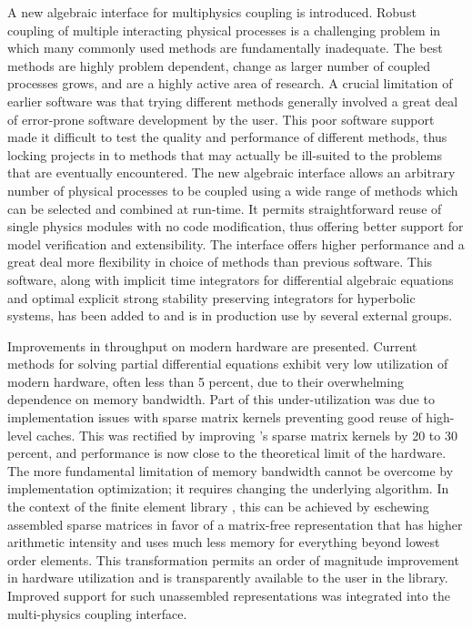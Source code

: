 A new algebraic interface for multiphysics coupling is introduced.
Robust coupling of multiple interacting physical processes is a challenging problem in which many commonly used methods are fundamentally inadequate.
The best methods are highly problem dependent, change as larger number of coupled processes grows, and are a highly active area of research.
A crucial limitation of earlier software was that trying different methods generally involved a great deal of error-prone software development by the user.
This poor software support made it difficult to test the quality and performance of different methods, thus locking projects in to methods that may actually be ill-suited to the problems that are eventually encountered.
The new algebraic interface allows an arbitrary number of physical processes to be coupled using a wide range of methods which can be selected and combined at run-time.
It permits straightforward reuse of single physics modules with no code modification, thus offering better support for model verification and extensibility.
The interface offers higher performance and a great deal more flexibility in choice of methods than previous software.
This software, along with implicit time integrators for differential algebraic equations and optimal explicit strong stability preserving integrators for hyperbolic systems, has been added to {\PETSc} and is in production use by several external groups.

Improvements in throughput on modern hardware are presented.
Current methods for solving partial differential equations exhibit very low utilization of modern hardware, often less than 5 percent, due to their overwhelming dependence on memory bandwidth.
Part of this under-utilization was due to implementation issues with sparse matrix kernels preventing good reuse of high-level caches.
This was rectified by improving \PETSc's sparse matrix kernels by 20 to 30 percent, and performance is now close to the theoretical limit of the hardware.
The more fundamental limitation of memory bandwidth cannot be overcome by implementation optimization; it requires changing the underlying algorithm.
In the context of the finite element library \Dohp, this can be achieved by eschewing assembled sparse matrices in favor of a matrix-free representation that has higher arithmetic intensity and uses much less memory for everything beyond lowest order elements.
This transformation permits an order of magnitude improvement in hardware utilization and is transparently available to the user in the {\Dohp} library.
Improved support for such unassembled representations was integrated into the multi-physics coupling interface.

